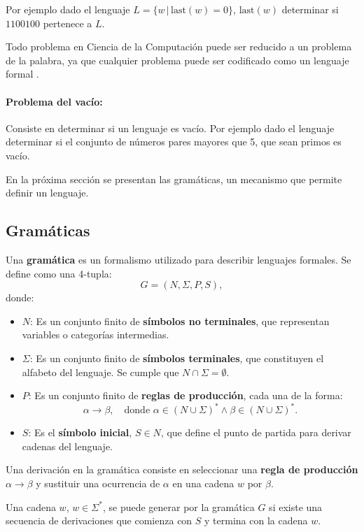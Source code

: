 \documentclass[12pt]{article}
\begin{document}
Por ejemplo dado el lenguaje $L=\{w\,|\,\text{last}(w)=0\}$, $\text{last}(w)$ determinar si $1100100$ pertenece a $L$.

Todo problema en Ciencia de la Computación puede ser reducido a un problema de la palabra, ya que cualquier problema puede ser codificado como un lenguaje formal \cite{authomataTheory}.

\paragraph{Problema del vacío:} Consiste en determinar si un lenguaje es vacío. 
Por ejemplo dado el lenguaje determinar si el conjunto de números pares mayores que 5, que sean primos es vacío.

En la próxima sección se presentan las gramáticas, un mecanismo que permite definir un lenguaje.

\subsection{Gramáticas}

Una \textbf{gramática} es un formalismo utilizado para describir lenguajes formales. Se define como una 4-tupla:
\[
  G = (N, \Sigma, P, S),
\]
donde:
\begin{itemize}
  \item \(N\): Es un conjunto finito de \textbf{símbolos no terminales}, que representan variables o categorías intermedias.
  \item \(\Sigma\): Es un conjunto finito de \textbf{símbolos terminales}, que constituyen el alfabeto del lenguaje. Se cumple que \(N \cap \Sigma = \emptyset\).
  \item \(P\): Es un conjunto finito de \textbf{reglas de producción}, cada una de la forma:
        \[
          \alpha \to \beta, \quad \text{donde } \alpha \in (N \cup \Sigma)^* \wedge \beta \in (N \cup \Sigma)^*.
        \]
  \item \(S\): Es el \textbf{símbolo inicial}, \(S \in N\), que define el punto de partida para derivar cadenas del lenguaje.
\end{itemize}

Una derivación en la gramática consiste en seleccionar una \textbf{regla de producción} $\alpha \to \beta$ y sustituir una ocurrencia de 
$\alpha$ en una cadena $w$ por $\beta$.

Una cadena $w$, $w\in\Sigma^*$,  se puede generar por la gramática $G$ si existe una secuencia de derivaciones que comienza con $S$
y termina con la cadena $w$.
\end{document}
